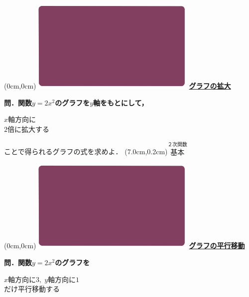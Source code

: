 \documentclass[10pt,
fleqn,
dvipdfmx,
uplatex
]{jsarticle}
\begin{document}
\newpage



\at(0cm,0cm){\includegraphics[width=8cm,bb=0 0 1920 1080]{./youtube/thumbnails/templates/smart_background/２次関数.jpeg}}
{\color{orange}\bf\boldmath\huge\underline{グラフの拡大}}\vspace{0.1zw}

\normalsize
\bf\boldmath 問．関数$y=2x^2$のグラフを$y$軸をもとにして，

\huge
\vspace{-0.0zw}
\hspace{0.1zw}
$x$軸方向に\\
\hfill $2$倍に拡大する
\hspace{0.1zw}

\normalsize
\vspace{0.5zw}
\hfill ことで得られるグラフの式を求めよ．
\at(7.0cm,0.2cm){\small\color{bradorange}$\overset{\text{２次関数}}{\text{基本}}$}


\newpage



\at(0cm,0cm){\includegraphics[width=8cm,bb=0 0 1920 1080]{./youtube/thumbnails/templates/smart_background/２次関数.jpeg}}
{\color{orange}\bf\boldmath\huge\underline{グラフの平行移動}}\vspace{0.3zw}

\large 
\bf\boldmath 問．関数$y=2x^2$のグラフを

\LARGE
\hspace{0.1zw}
$x$軸方向に$3,\;y$軸方向に$1$\\
\hfill だけ平行移動する
\hspace{0.1zw}
\end{document}
